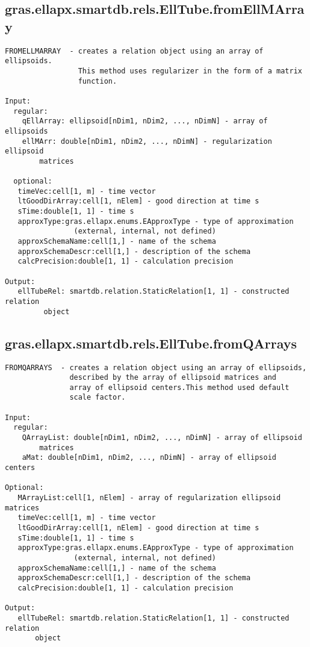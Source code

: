 \subsection{\texorpdfstring{gras.ellapx.smartdb.rels.EllTube.fromEllMArray}{fromEllMArray}}\label{method:gras.ellapx.smartdb.rels.EllTube.fromEllMArray}
\begin{verbatim}
FROMELLMARRAY  - creates a relation object using an array of ellipsoids.
                 This method uses regularizer in the form of a matrix
                 function.

Input:
  regular:
    qEllArray: ellipsoid[nDim1, nDim2, ..., nDimN] - array of ellipsoids
    ellMArr: double[nDim1, nDim2, ..., nDimN] - regularization ellipsoid
        matrices

  optional:
   timeVec:cell[1, m] - time vector
   ltGoodDirArray:cell[1, nElem] - good direction at time s
   sTime:double[1, 1] - time s
   approxType:gras.ellapx.enums.EApproxType - type of approximation
                (external, internal, not defined)
   approxSchemaName:cell[1,] - name of the schema
   approxSchemaDescr:cell[1,] - description of the schema
   calcPrecision:double[1, 1] - calculation precision

Output:
   ellTubeRel: smartdb.relation.StaticRelation[1, 1] - constructed relation
         object
\end{verbatim}
\subsection{\texorpdfstring{gras.ellapx.smartdb.rels.EllTube.fromQArrays}{fromQArrays}}\label{method:gras.ellapx.smartdb.rels.EllTube.fromQArrays}
\begin{verbatim}
FROMQARRAYS  - creates a relation object using an array of ellipsoids,
               described by the array of ellipsoid matrices and
               array of ellipsoid centers.This method used default
               scale factor.

Input:
  regular:
    QArrayList: double[nDim1, nDim2, ..., nDimN] - array of ellipsoid
        matrices
    aMat: double[nDim1, nDim2, ..., nDimN] - array of ellipsoid centers

Optional:
   MArrayList:cell[1, nElem] - array of regularization ellipsoid matrices
   timeVec:cell[1, m] - time vector
   ltGoodDirArray:cell[1, nElem] - good direction at time s
   sTime:double[1, 1] - time s
   approxType:gras.ellapx.enums.EApproxType - type of approximation
                (external, internal, not defined)
   approxSchemaName:cell[1,] - name of the schema
   approxSchemaDescr:cell[1,] - description of the schema
   calcPrecision:double[1, 1] - calculation precision

Output:
   ellTubeRel: smartdb.relation.StaticRelation[1, 1] - constructed relation
       object
\end{verbatim}
